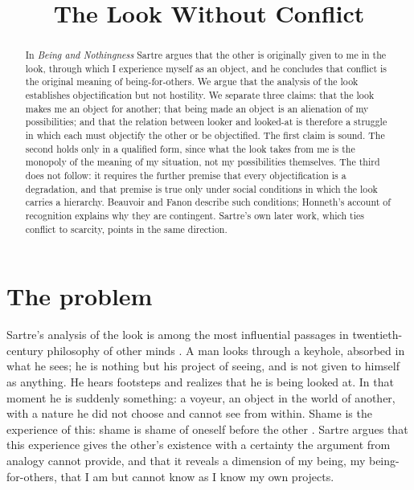 \documentclass{situationist-preprint}
\title{The Look Without Conflict}
\begin{document}
\maketitle

\begin{abstract}
In \emph{Being and Nothingness} Sartre argues that the other is originally given to me in the look, through which I experience myself as an object, and he concludes that conflict is the original meaning of being-for-others. We argue that the analysis of the look establishes objectification but not hostility. We separate three claims: that the look makes me an object for another; that being made an object is an alienation of my possibilities; and that the relation between looker and looked-at is therefore a struggle in which each must objectify the other or be objectified. The first claim is sound. The second holds only in a qualified form, since what the look takes from me is the monopoly of the meaning of my situation, not my possibilities themselves. The third does not follow: it requires the further premise that every objectification is a degradation, and that premise is true only under social conditions in which the look carries a hierarchy. Beauvoir and Fanon describe such conditions; Honneth's account of recognition explains why they are contingent. Sartre's own later work, which ties conflict to scarcity, points in the same direction.
\end{abstract}

\section{The problem}

Sartre's analysis of the look is among the most influential passages in twentieth-century philosophy of other minds \citep[Part~III, ch.~1, \S4]{Sartre1943}. A man looks through a keyhole, absorbed in what he sees; he is nothing but his project of seeing, and is not given to himself as anything. He hears footsteps and realizes that he is being looked at. In that moment he is suddenly something: a voyeur, an object in the world of another, with a nature he did not choose and cannot see from within. Shame is the experience of this: shame is shame of oneself before the other \citep[Part~III, ch.~1]{Sartre1943}. Sartre argues that this experience gives the other's existence with a certainty the argument from analogy cannot provide, and that it reveals a dimension of my being, my being-for-others, that I am but cannot know as I know my own projects.
\end{document}

